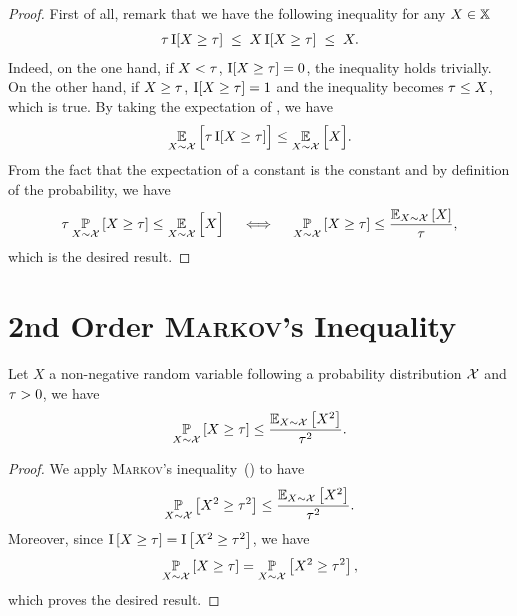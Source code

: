 \begin{noaddcontents}\begin{proof}
First of all, remark that we have the following inequality for any $X\in\mathbb{X}$
\begin{align}
    \tau\operatorname{I}[X \ge \tau] \;\le\; X\operatorname{I}[X \ge \tau] \;\le\; X.
    \label{ap:tools:eq:proof-general-markov}
\end{align}
Indeed, on the one hand, if $X<\tau$, $\operatorname{I}[X \ge \tau]=0$, the inequality holds trivially.
On the other hand, if $X\ge\tau$, $\operatorname{I}[X \ge \tau]=1$ and the inequality becomes $\tau\le X$, which is true.
By taking the expectation of , we have
\begin{align*}
    \operatorname*{\mathbb{E}}_{X\sim\mathcal{X}}\Big[\tau\operatorname{I}[X \ge \tau]\Big] \le \operatorname*{\mathbb{E}}_{X\sim\mathcal{X}}\Big[ X\Big].
\end{align*}
From the fact that the expectation of a constant is the constant and by definition of the probability, we have
\begin{align*}
    \tau\operatorname*{\mathbb{P}}_{X\sim\mathcal{X}}\left[ X \ge \tau\right] \le \operatorname*{\mathbb{E}}_{X\sim\mathcal{X}}\Big[ X\Big] \quad\iff\quad \operatorname*{\mathbb{P}}_{X\sim\mathcal{X}}\left[ X \ge \tau\right] \le \frac{\operatorname*{\mathbb{E}}_{X\sim\mathcal{X}}\left[ X\right]}{\tau},
\end{align*}
which is the desired result.
\end{proof}\end{noaddcontents}

\section{2nd Order \textsc{Markov}'s Inequality}

\begin{theorem}
Let $X$ a non-negative random variable  following a probability distribution $\mathcal{X}$ and $\tau>0$, we have
\begin{align*}
    \operatorname*{\mathbb{P}}_{X\sim\mathcal{X}}\left[ X\ge \tau\right] \le \frac{\operatorname*{\mathbb{E}}_{X\sim\mathcal{X}}\left[ X^2\right]}{\tau^2}.
\end{align*}
\label{ap:tools:theorem:snd-markov}
\end{theorem}
\begin{noaddcontents}\begin{proof}
We apply \textsc{Markov}'s inequality~() to have
\begin{align*}
\operatorname*{\mathbb{P}}_{X\sim\mathcal{X}}\left[ X^2\ge \tau^2\right] \le \frac{\operatorname*{\mathbb{E}}_{X\sim\mathcal{X}}\left[ X^2\right]}{\tau^2}.
\end{align*}
Moreover, since $\operatorname{I}\left[ X\ge \tau\right] = \operatorname{I}\left[ X^2\ge \tau^2 \right]$, we have
\begin{align*}
    \operatorname*{\mathbb{P}}_{X\sim\mathcal{X}}\left[ X\ge \tau\right] = \operatorname*{\mathbb{P}}_{X\sim\mathcal{X}}\left[ X^2\ge \tau^2\right],
\end{align*}
which proves the desired result.
\end{proof}\end{noaddcontents}

